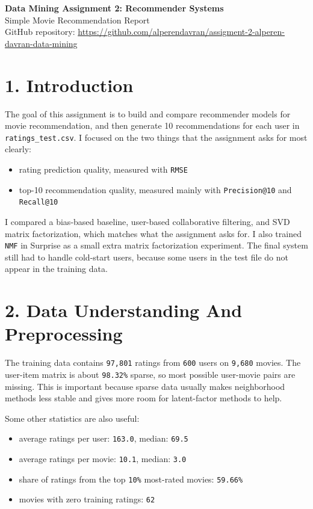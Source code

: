 \documentclass[10pt,a4paper]{article}
\begin{document}
\begin{center}
{\Large \textbf{Data Mining Assignment 2: Recommender Systems}}\\[0.4em]
\normalsize Simple Movie Recommendation Report\\[0.3em]
\small GitHub repository: \url{https://github.com/alperendavran/assigment-2-alperen-davran-data-mining}
\end{center}

\section*{1. Introduction}
The goal of this assignment is to build and compare recommender models for movie recommendation, and then generate 10 recommendations for each user in \texttt{ratings\_test.csv}. I focused on the two things that the assignment asks for most clearly:

\begin{itemize}
\item rating prediction quality, measured with \texttt{RMSE}
\item top-10 recommendation quality, measured mainly with \texttt{Precision@10} and \texttt{Recall@10}
\end{itemize}

I compared a bias-based baseline, user-based collaborative filtering, and SVD matrix factorization, which matches what the assignment asks for. I also trained \texttt{NMF} in Surprise as a small extra matrix factorization experiment. The final system still had to handle cold-start users, because some users in the test file do not appear in the training data.

\section*{2. Data Understanding And Preprocessing}
The training data contains \texttt{97,801} ratings from \texttt{600} users on \texttt{9,680} movies. The user-item matrix is about \texttt{98.32\%} sparse, so most possible user-movie pairs are missing. This is important because sparse data usually makes neighborhood methods less stable and gives more room for latent-factor methods to help.

Some other statistics are also useful:

\begin{itemize}
\item average ratings per user: \texttt{163.0}, median: \texttt{69.5}
\item average ratings per movie: \texttt{10.1}, median: \texttt{3.0}
\item share of ratings from the top \texttt{10\%} most-rated movies: \texttt{59.66\%}
\item movies with zero training ratings: \texttt{62}
\end{itemize}
\end{document}
